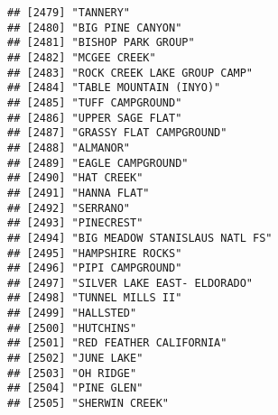 \documentclass[
]{article}
\begin{document}
\begin{verbatim}
## [2479] "TANNERY"                                                                             
## [2480] "BIG PINE CANYON"                                                                     
## [2481] "BISHOP PARK GROUP"                                                                   
## [2482] "MCGEE CREEK"                                                                         
## [2483] "ROCK CREEK LAKE GROUP CAMP"                                                          
## [2484] "TABLE MOUNTAIN (INYO)"                                                               
## [2485] "TUFF CAMPGROUND"                                                                     
## [2486] "UPPER SAGE FLAT"                                                                     
## [2487] "GRASSY FLAT CAMPGROUND"                                                              
## [2488] "ALMANOR"                                                                             
## [2489] "EAGLE CAMPGROUND"                                                                    
## [2490] "HAT CREEK"                                                                           
## [2491] "HANNA FLAT"                                                                          
## [2492] "SERRANO"                                                                             
## [2493] "PINECREST"                                                                           
## [2494] "BIG MEADOW STANISLAUS NATL FS"                                                       
## [2495] "HAMPSHIRE ROCKS"                                                                     
## [2496] "PIPI CAMPGROUND"                                                                     
## [2497] "SILVER LAKE EAST- ELDORADO"                                                          
## [2498] "TUNNEL MILLS II"                                                                     
## [2499] "HALLSTED"                                                                            
## [2500] "HUTCHINS"                                                                            
## [2501] "RED FEATHER CALIFORNIA"                                                              
## [2502] "JUNE LAKE"                                                                           
## [2503] "OH RIDGE"                                                                            
## [2504] "PINE GLEN"                                                                           
## [2505] "SHERWIN CREEK"                                                                       

\end{verbatim}
\end{document}

